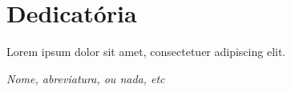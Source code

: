 \chapter*{Dedicatória}
\vfill
\begin{flushleft}

    Lorem ipsum dolor sit amet, consectetuer adipiscing elit.

\end{flushleft}
\begin{flushright}
    \textit{Nome, abreviatura, ou nada, etc}
\end{flushright}
\vfill